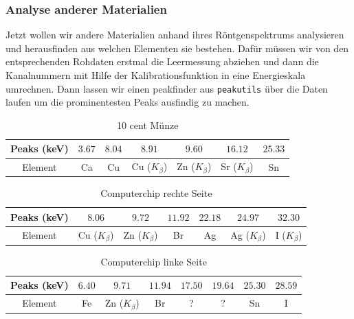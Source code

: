 \documentclass[a4paper,14pt]{article}
\newcommand{\code}[1]{\colorbox{codegray}{\texttt{#1}}}
\begin{document}
\subsubsection{Analyse anderer Materialien}
Jetzt wollen wir andere Materialien  anhand ihres Röntgenspektrums analysieren und herausfinden aus welchen Elementen sie bestehen. Dafür müssen wir von den entsprechenden Rohdaten erstmal die Leermessung abziehen und dann die Kanalnummern mit Hilfe der Kalibrationsfunktion in eine Energieskala umrechnen. Dann lassen wir einen peakfinder aus \code{peakutils} über die Daten laufen um die prominentesten Peaks ausfindig zu machen.

\begin{table}[H]
	\renewcommand{\arraystretch}{1}
	\centering
	\Large
	\begin{adjustbox}{width=\textwidth}
		\begin{tabular}{|c|c|c|c|c|c|c|}
			\hline
			Peaks (keV) & $3.67$ & $8.04$ & $8.91$ & $9.60$ & $16.12$ & $25.33$ \\
			\hline
			Element & Ca & Cu & Cu ($K_\beta$) & Zn ($K_\beta$) & Sr ($K_\beta$) & Sn \\
			\hline
		\end{tabular}
	\end{adjustbox}
	\caption{ 10 cent M\"unze}
	\label{tab: }
\end{table}
\begin{table}[H]
	\renewcommand{\arraystretch}{1}
	\centering
	\Large
	\begin{adjustbox}{width=\textwidth}
		\begin{tabular}{|c|c|c|c|c|c|c|}
			\hline
			Peaks (keV) & $8.06$ & $9.72$ & $11.92$ & $22.18$ & $24.97$ & $32.30$ \\
			\hline
			Element & Cu ($K_\beta$) & Zn ($K_\beta$) & Br & Ag & Ag ($K_\beta$) & I ($K_\beta$) \\
			\hline
		\end{tabular}
	\end{adjustbox}
	\caption{ Computerchip rechte Seite }
	\label{tab: }
\end{table}
\begin{table}[H]
	\renewcommand{\arraystretch}{1}
	\centering
	\Large
	\begin{adjustbox}{width=\textwidth}
		\begin{tabular}{|c|c|c|c|c|c|c|c|}
			\hline
			Peaks (keV) & $6.40$ & $9.71$ & $11.94$ & $17.50$ & $19.64$ & $25.30$ & $28.59$ \\
			\hline
			Element & Fe & Zn ($K_\beta$) & Br & ? & ? & Sn & I \\
			\hline
		\end{tabular}
	\end{adjustbox}
	\caption{ Computerchip linke Seite }
	\label{tab: }
\end{table}
\end{document}
